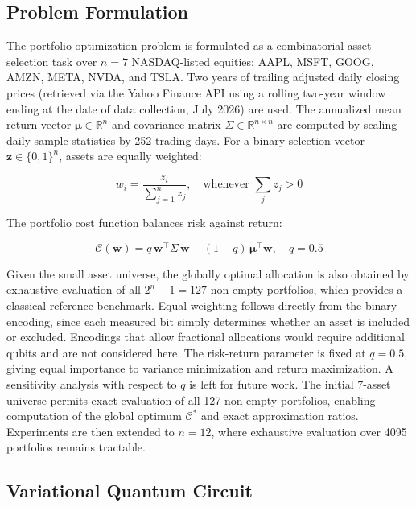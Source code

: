 \documentclass[runningheads]{llncs}
\begin{document}
\subsection{Problem Formulation}
The portfolio optimization problem is formulated as a combinatorial asset selection task over $n = 7$ NASDAQ-listed equities: AAPL, MSFT, GOOG, AMZN, META, NVDA, and TSLA. Two years of trailing adjusted daily closing prices (retrieved via the Yahoo Finance API \cite{yfinance} using a rolling two-year window ending at the date of data collection, July 2026) are used. The annualized mean return vector $\boldsymbol{\mu} \in \mathbb{R}^n$ and covariance matrix $\Sigma \in \mathbb{R}^{n \times n}$ are computed by scaling daily sample statistics by 252 trading days. For a binary selection vector $\mathbf{z} \in \{0,1\}^n$, assets are equally weighted:

\begin{equation}
w_i = \frac{z_i}{\sum_{j=1}^{n} z_j}, \quad 
\text{whenever } \sum_j z_j > 0
\end{equation}

The portfolio cost function balances risk against return:

\begin{equation}
    \mathcal{C}(\mathbf{w}) = q\,\mathbf{w}^\top 
    \Sigma\,\mathbf{w} - (1-q)\,\boldsymbol{\mu}^\top 
    \mathbf{w}, \quad q = 0.5
\end{equation}

Given the small asset universe, the globally optimal allocation is also obtained
by exhaustive evaluation of all $2^n - 1 = 127$ non-empty portfolios, which provides a classical reference benchmark.
Equal weighting follows directly from the binary encoding, since each measured
bit simply determines whether an asset is included or excluded. Encodings that
allow fractional allocations would require additional qubits and are not considered here.
The risk-return parameter is fixed at $q=0.5$, giving equal importance to
variance minimization and return maximization. A sensitivity analysis with respect to $q$ is left for future work.
The initial 7-asset universe permits exact evaluation of all 127 non-empty
portfolios, enabling computation of the global optimum $\mathcal{C}^*$ and exact approximation ratios. Experiments are then extended to $n=12$, where exhaustive evaluation over 4095 portfolios remains tractable.

\subsection{Variational Quantum Circuit}
\end{document}
